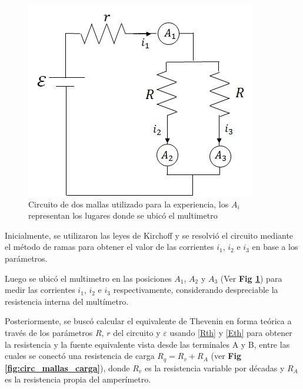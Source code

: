 \documentclass[11pt,a4paper]{article}
\begin{document}
\begin{figure}[h]
  \centering
  \includegraphics[scale=0.55]{Mallas_sin_carga}
  \caption{Circuito de dos mallas utilizado para la experiencia, los $A_i$ representan los lugares donde se ubicó el multimetro}
  \label{fig:circ_mallas}
\end{figure}

Inicialmente, se utilizaron las leyes de Kirchoff y se resolvió el circuito mediante el método de ramas para obtener el valor de las corrientes $i_1$, $i_2$ e $i_3$ en base a los parámetros. 
 
Luego se ubicó el multimetro en las posiciones $A_1$, $A_2$ y $A_3$ (Ver \textbf{Fig \ref{fig:circ_mallas}}) para medir las corrientes $i_1$, $i_2$ e $i_3$ respectivamente, considerando despreciable la resistencia interna del multímetro.
 
Posteriormente, se buscó calcular el equivalente de Thevenin en forma teórica a través de los parámetros $R$, $r$ del circuito y $\varepsilon$ usando \eqref{Rth} y \eqref{Eth} para obtener la resistencia y la fuente equivalente vista desde las terminales A y B, entre las cuales se conectó una resistencia de carga $R_q = R_v + R_A$ (ver \textbf{Fig \ref{fig:circ_mallas_carga}}), donde $R_v$ es la resistencia variable por décadas y $R_A$ es la resistencia propia del amperímetro. 
\end{document}
